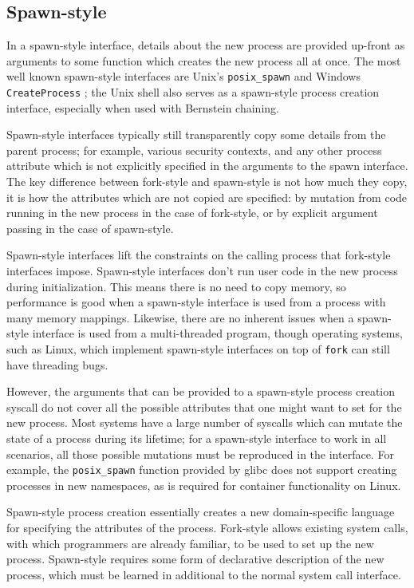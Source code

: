 \documentclass[sigplan]{acmart}
\begin{document}
\subsection{Spawn-style}
In a spawn-style interface,
details about the new process are provided up-front as arguments to some function
which creates the new process all at once.
The most well known spawn-style interfaces are Unix's \texttt{posix\_spawn} \cite{posix_spawn}
and Windows \texttt{CreateProcess} \cite{create_process};
the Unix shell also serves as a spawn-style process creation interface,
especially when used with Bernstein chaining\cite{chainloading}.

Spawn-style interfaces typically still transparently copy some details from the parent process;
for example, various security contexts,
and any other process attribute which is not explicitly specified in the arguments to the spawn interface.
The key difference between fork-style and spawn-style is not how much they copy,
it is how the attributes which are not copied are specified:
by mutation from code running in the new process in the case of fork-style,
or by explicit argument passing in the case of spawn-style.

Spawn-style interfaces lift the constraints on the calling process that fork-style interfaces impose.
Spawn-style interfaces don't run user code in the new process during initialization.
This means there is no need to copy memory,
so performance is good when a spawn-style interface is used from a process with many memory mappings.
Likewise, there are no inherent issues when a spawn-style interface is used from a multi-threaded program,
though operating systems, such as Linux,
which implement spawn-style interfaces on top of \texttt{fork} can still have threading bugs.

However, the arguments that can be provided to a spawn-style process creation syscall
do not cover all the possible attributes that one might want to set for the new process.
Most systems have a large number of syscalls which can mutate the state of a process during its lifetime;
for a spawn-style interface to work in all scenarios,
all those possible mutations must be reproduced in the interface.
For example, the \texttt{posix\_spawn} function provided by glibc does not support creating processes in new namespaces,
as is required for container functionality on Linux.

Spawn-style process creation
essentially creates a new domain-specific language for specifying the attributes of the process.
Fork-style allows existing system calls,
with which programmers are already familiar,
to be used to set up the new process.
Spawn-style requires some form of declarative description of the new process,
which must be learned in additional to the normal system call interface.
\end{document}
